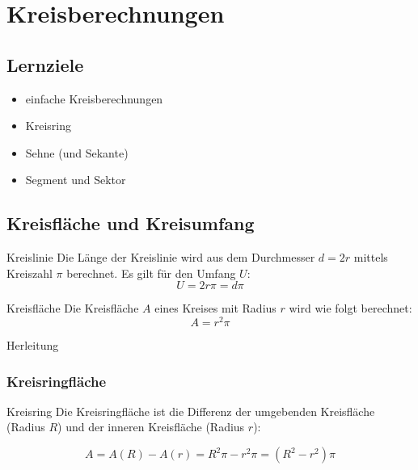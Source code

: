
\section{Kreisberechnungen}


\subsection*{Lernziele}

\begin{itemize}
\item einfache Kreisberechnungen
\item Kreisring
\item Sehne (und Sekante)
\item Segment und Sektor
\end{itemize}

\newpage


\subsection{Kreisfläche und Kreisumfang}

\begin{gesetz}{Kreislinie}{}\index{$\pi$}
  Die Länge der Kreislinie wird aus dem Durchmesser $d=2r$  mittels Kreiszahl
  $\pi$ berechnet. Es gilt für den Umfang $U$:
  $$U = 2r\pi = d\pi$$
\end{gesetz}

\begin{gesetz}{Kreisfläche}{}
  Die Kreisfläche $A$ eines Kreises mit Radius $r$ wird wie folgt
  berechnet:
  $$A = r^2\pi$$
\end{gesetz}
Herleitung

\subsubsection{Kreisringfläche}


\begin{gesetz}{Kreisring}{}
  Die Kreisringfläche ist die Differenz der umgebenden Kreisfläche
  (Radius $R$) und
  der inneren Kreisfläche (Radius $r$):

  $$A = A(R) - A(r) = R^2\pi - r^2\pi = (R^2-r^2)\pi$$
\end{gesetz}

